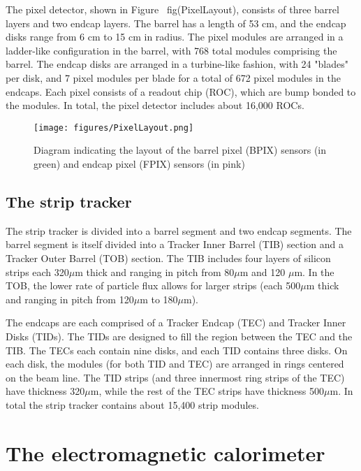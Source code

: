 The pixel detector, shown in Figure ~fig(PixelLayout), consists of three barrel layers and two endcap layers. The barrel has a length of 53 cm, and the endcap disks range from 6 cm to 15 cm in radius. The pixel modules are arranged in a ladder-like configuration in the barrel, with 768 total modules comprising the barrel. The endcap disks are arranged in a turbine-like fashion, with 24 "blades" per disk, and 7 pixel modules per blade for a total of 672 pixel modules in the endcaps.
Each pixel consists of a readout chip (ROC), which are bump bonded to the modules. In total, the pixel detector includes about 16,000 ROCs.

\begin{figure}\centering
  \texttt{[image: figures/PixelLayout.png]}
  \caption{\label{fig:PixelLayout} Diagram indicating the layout of the barrel pixel (BPIX) sensors (in green) and endcap pixel (FPIX) sensors (in pink)}
\end{figure}

\subsection{The strip tracker}

The strip tracker is divided into a barrel segment and two endcap segments. The barrel segment is itself divided into a Tracker Inner Barrel (TIB) section and a Tracker Outer Barrel (TOB) section. The TIB includes four layers of silicon strips each 320$\mu$m thick and ranging in pitch from 80$\mu$m and 120 $\mu$m. In the TOB, the lower rate of particle flux allows for larger strips (each 500$\mu$m thick and ranging in pitch from 120$\mu$m to 180$\mu$m).

The endcaps are each comprised of a Tracker Endcap (TEC) and Tracker Inner Disks (TIDs). The TIDs are designed to fill the region between the TEC and the TIB. The TECs each contain nine disks, and each TID contains three disks. On each disk, the modules (for both TID and TEC) are arranged in rings centered on the beam line. The TID strips (and three innermost ring strips of the TEC) have thickness 320$\mu$m, while the rest of the TEC strips have thickness 500$\mu$m. In total the strip tracker contains about 15,400 strip modules.  



\section{The electromagnetic calorimeter}

